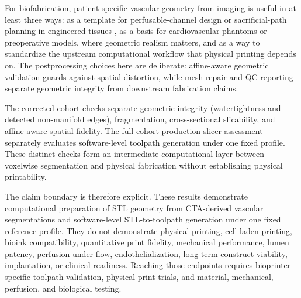 \documentclass[anonymous]{iopjournal}
\begin{document}
For biofabrication, patient-specific vascular geometry from imaging is useful in at least three ways: as a template for perfusable-channel design or sacrificial-path planning in engineered tissues \cite{kolesky2014,hinton2015}, as a basis for cardiovascular phantoms or preoperative models, where geometric realism matters, and as a way to standardize the upstream computational workflow that physical printing depends on. The postprocessing choices here are deliberate: affine-aware geometric validation guards against spatial distortion, while mesh repair and QC reporting separate geometric integrity from downstream fabrication claims.

The corrected cohort checks separate geometric integrity (watertightness and detected non-manifold edges), fragmentation, cross-sectional slicability, and affine-aware spatial fidelity. The full-cohort production-slicer assessment separately evaluates software-level toolpath generation under one fixed profile. These distinct checks form an intermediate computational layer between voxelwise segmentation and physical fabrication without establishing physical printability.

The claim boundary is therefore explicit. These results demonstrate computational preparation of STL geometry from CTA-derived vascular segmentations and software-level STL-to-toolpath generation under one fixed reference profile. They do not demonstrate physical printing, cell-laden printing, bioink compatibility, quantitative print fidelity, mechanical performance, lumen patency, perfusion under flow, endothelialization, long-term construct viability, implantation, or clinical readiness. Reaching those endpoints requires bioprinter-specific toolpath validation, physical print trials, and material, mechanical, perfusion, and biological testing.
\end{document}
